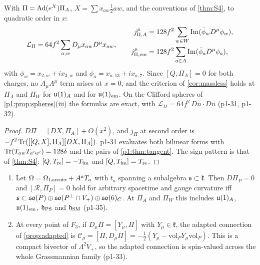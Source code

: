 \begin{theorem}
\label{p1:thm:kinetic}
With $\Pi=\Ad(e^X)\Pi_A$, $X=\sum x_{aw}\tfrac12aw$, and the conventions of \cref{thm:S4}, to quadratic order in $x$:
\[
\mathcal L_\Pi=64f^2\sum_{a,w}D_\mu x_{aw}D^\mu x_{aw},\qquad
\begin{aligned}
j^\mu_{\Pi,A}&=128f^2\sum_{w\in W}\Im(\bar\phi_wD^\mu\phi_w),\\
j^\mu_{\Pi,\rm em}&=128f^2\sum_{a\in A}\Im(\bar\phi_aD^\mu\phi_a),
\end{aligned}
\]
with $\phi_w=x_{2,w}+ix_{3,w}$ and $\phi_a=x_{a,13}+ix_{a,7}$. Since $[Q,\Pi_A]=0$ for both charges, no $A_\mu A^\mu$ term arises at $x=0$, and the criterion of
\cref{cor:massless} holds at $\Pi_A$ and $\Pi_W$ for $\uu1_A$ and for $\uu1_{\rm em}$. On the Clifford spheres of \cref{p1:prop:spheres}(iii) the formulas are exact,
with $\mathcal L_\Pi=64f^2\,Dn\cdot Dn$ (p1-31, p1-32).
\end{theorem}

\begin{proof}
$D\Pi=[DX,\Pi_A]+O(x^2)$, and $j_\Pi$ at second order is $-f^2\Tr([[Q,X],\Pi_A][DX,\Pi_A])$. p1-31 evaluates both bilinear forms with $\Tr(T_{aw}T_{a'w'})=128\delta$ and the
pairs of \cref{p1:thm:tangent}. The sign pattern is that of \cref{thm:S4}: $[Q,T_{\rm re}]=-T_{\rm im}$ and $[Q,T_{\rm im}]=T_{\rm re}$.
\end{proof}

\begin{theorem}
\label{p1:thm:curved}
\begin{enumerate}[label=(\roman*),leftmargin=2.2em]
\item Let $\Omega=\Omega_{\rm Lorentz}+A^aT_a$ with $t_a$ spanning a subalgebra $\mathfrak s\subset\mathfrak k$. Then $D\Pi_P=0$ and $[\mathcal R,\Pi_P]=0$ hold for arbitrary spacetime and
gauge curvature iff $\mathfrak s\subset\so P\oplus\so{P^\perp\cap V_+}\oplus\so6_C$. At $\Pi_A$ and $\Pi_W$ this includes $\uu1_A$, $\uu1_{\rm em}$, $\mathfrak h_{\rm PS}$ and
$\mathfrak h_{\rm SM}$ (p1-35).
\item At every point of $F_3$, if $D_\mu\Pi=[Y_\mu,\Pi]$ with $Y_\mu\in\mathfrak k$, the adapted connection of \cref{prop:adapted} is
$\mathcal C_\mu=[\Pi,D_\mu\Pi]=-\tfrac12(Y_\mu-\mathrm{vol}_PY_\mu\mathrm{vol}_P)$. This is a compact bivector of $\Lambda^2V_+$, so the adapted connection is spin-valued across
the whole Grassmannian family (p1-33).
\end{enumerate}
\end{theorem}

